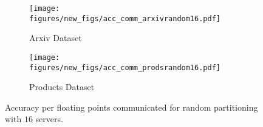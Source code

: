 \documentclass[lettersize,journal]{IEEEtran}
\begin{document}
\begin{figure*}
	\begin{subfigure}{0.5\textwidth}
		\centering
		\texttt{[image: figures/new\_figs/acc\_comm\_arxivrandom16.pdf]}
		\caption{Arxiv Dataset}
		\label{fig:eff_arxiv}
	\end{subfigure}%
	\begin{subfigure}{0.5\textwidth}
		\centering
		\texttt{[image: figures/new\_figs/acc\_comm\_prodsrandom16.pdf]}
		\caption{Products Dataset}
		\label{fig:eff_prods}
	\end{subfigure}
	\caption{Accuracy per floating points communicated for random partitioning with $16$ servers.}
	\label{fig:efficiency}
\end{figure*}
\end{document}
